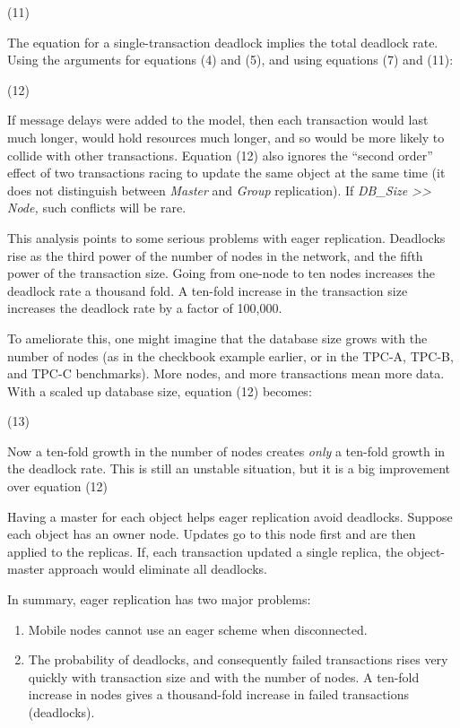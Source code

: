 \documentclass[a4paper,12pt,twoside,openright]{article}
\begin{document}
(11)

The equation for a single-transaction deadlock implies the total
deadlock rate. Using the arguments for equations (4) and (5), and using
equations (7) and (11):

(12)

If message delays were added to the model, then each transaction would
last much longer, would hold resources much longer, and so would be more
likely to collide with other transactions. Equation (12) also ignores
the ``second order'' effect of two transactions racing to update the
same object at the same time (it does not distinguish between
\emph{Master} and \emph{Group} replication). If \emph{DB\_Size
\textgreater{}\textgreater{} Node,} such conflicts will be rare.

This analysis points to some serious problems with eager replication.
Deadlocks rise as the third power of the number of nodes in the network,
and the fifth power of the transaction size. Going from one-node to ten
nodes increases the deadlock rate a thousand fold. A ten-fold increase
in the transaction size increases the deadlock rate by a factor of
100,000.

To ameliorate this, one might imagine that the database size grows with
the number of nodes (as in the checkbook example earlier, or in the
TPC-A, TPC-B, and TPC-C benchmarks). More nodes, and more transactions
mean more data. With a scaled up database size, equation (12) becomes:

(13)

Now a ten-fold growth in the number of nodes creates \emph{only} a
ten-fold growth in the deadlock rate. This is still an unstable
situation, but it is a big improvement over equation (12)

Having a master for each object helps eager replication avoid deadlocks.
Suppose each object has an owner node. Updates go to this node first and
are then applied to the replicas. If, each transaction updated a single
replica, the object-master approach would eliminate all deadlocks.

In summary, eager replication has two major problems:

\begin{enumerate}
\def\labelenumi{\arabic{enumi}.}
\item
  Mobile nodes cannot use an eager scheme when disconnected.
\item
  The probability of deadlocks, and consequently failed transactions
  rises very quickly with transaction size and with the number of nodes.
  A ten-fold increase in nodes gives a thousand-fold increase in failed
  transactions (deadlocks).
\end{enumerate}
\end{document}
